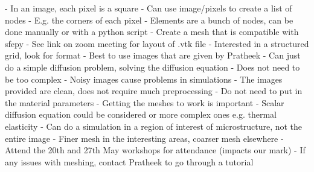 \documentclass{article}
\begin{document}
- In an image, each pixel is a square\newline\newline
- Can use image/pixels to create a list of nodes\newline\newline
- E.g. the corners of each pixel\newline\newline
- Elements are a bunch of nodes, can be done manually or with a python script\newline\newline
- Create a mesh that is compatible with sfepy\newline\newline
- See link on zoom meeting for layout of .vtk file\newline\newline
- Interested in a structured grid, look for format\newline\newline
- Best to use images that are given by Pratheek\newline\newline
- Can just do a simple diffusion problem, solving the diffusion equation\newline\newline
- Does not need to be too complex\newline\newline
- Noisy images cause problems in simulations\newline\newline
- The images provided are clean, does not require much preprocessing\newline\newline
- Do not need to put in the material parameters\newline\newline
- Getting the meshes to work is important\newline\newline
- Scalar diffusion equation could be considered or more complex ones e.g. thermal elasticity\newline\newline
- Can do a simulation in a region of interest of microstructure, not the entire image\newline\newline
- Finer mesh in the interesting areas, coarser mesh elsewhere\newline\newline
- Attend the 20th and 27th May workshops for attendance (impacts our mark)\newline\newline
- If any issues with meshing, contact Pratheek to go through a tutorial \newline\newline
\end{document}
